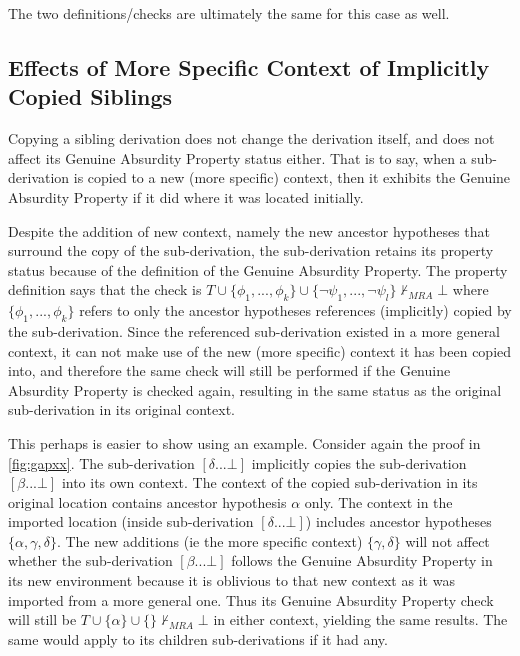 \documentclass[11pt,twoside,a4paper]{report}
\begin{document}
The two definitions/checks are ultimately the same for this case as well.

\subsection{Effects of More Specific Context of Implicitly Copied Siblings}
\label{subsec:gap4ever}
Copying a sibling derivation does not change the derivation itself, and does not affect its Genuine Absurdity Property status either. That is to say, when a sub-derivation is copied to a new (more specific) context, then it exhibits the Genuine Absurdity Property if it did where it was located initially.

Despite the addition of new context, namely the new ancestor hypotheses that surround the copy of the sub-derivation, the sub-derivation retains its property status because of the definition of the Genuine Absurdity Property. The property definition says that the check is $T\cup\{\phi_1, ..., \phi_k\}\cup\{\neg\psi_1, ..., \neg\psi_l\}\nvdash_{MRA}\bot$ where $\{\phi_1, ..., \phi_k\}$ refers to only the ancestor hypotheses references (implicitly) copied by the sub-derivation. Since the referenced sub-derivation existed in a more general context, it can not make use of the new (more specific) context it has been copied into, and therefore the same check will still be performed if the Genuine Absurdity Property is checked again, resulting in the same status as the original sub-derivation in its original context.

This perhaps is easier to show using an example. Consider again the proof in \autoref{fig:gapxx}. The sub-derivation $[\delta ... \bot]$ implicitly copies the sub-derivation $[\beta ... \bot]$ into its own context. The context of the copied sub-derivation in its original location contains ancestor hypothesis $\alpha$ only. The context in the imported location (inside sub-derivation $[\delta ... \bot]$) includes ancestor hypotheses $\{\alpha, \gamma, \delta\}$. The new additions (ie the more specific context) $\{\gamma, \delta\}$ will not affect whether the sub-derivation $[\beta ... \bot]$ follows the Genuine Absurdity Property in its new environment because it is oblivious to that new context as it was imported from a more general one. Thus its Genuine Absurdity Property check will still be $T\cup\{\alpha\}\cup\{\}\nvdash_{MRA}\bot$ in either context, yielding the same results. The same would apply to its children sub-derivations if it had any.

\end{document}
